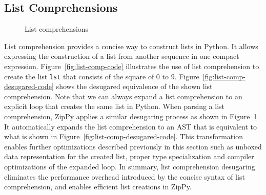 \subsection{List Comprehensions}

\begin{figure}[h]
\centering
{}
\caption{List comprehensions}
\label{fig:list-comp}
\end{figure}

List comprehension provides a concise way to construct lists in Python.
It allows expressing the construction of a list from another sequence in one compact expression.
Figure~\ref{fig:list-comp-code} illustrates the use of list comprehension to create the list \texttt{lst} that consists of the square of $0$ to $9$.
Figure~\ref{fig:list-comp-desugared-code} shows the desugared equivalence of the shown list comprehension.
Note that we can always expand a list comprehension to an explicit loop that creates the same list in Python.
When parsing a list comprehension, ZipPy applies a similar desugaring process as shown in Figure~\ref{fig:list-comp}.
It automatically expands the list comprehension to an AST that is equivalent to what is shown in Figure~\ref{fig:list-comp-desugared-code}.
This transformation enables further optimizations described previously in this section such as unboxed data representation for the created list, proper type specialization and compiler optimizations of the expanded loop.
In summary, list comprehension desugaring eliminates the performance overhead introduced by the concise syntax of list comprehension, and enables efficient list creations in ZipPy.
